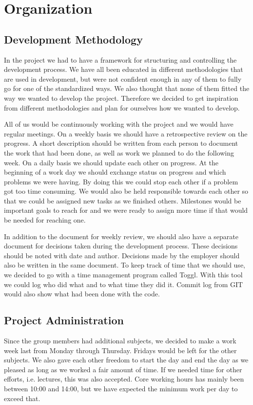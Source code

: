 \section{Organization}
\label{sec:organization}

\subsection{Development Methodology}
\label{subsec:development_methodology}
In the project we had to have a framework for structuring and controlling the
development process. We have all been educated in different methodologies that
are used in development, but were not confident enough in any of them to fully
go for one of the standardized ways. We also thought that none of them fitted 
the way we wanted to develop the project. Therefore we decided to get inspiration
from different methodologies and plan for ourselves how we wanted to develop.

All of us would be continuously working with the project and we would have
regular meetings. On a weekly basis we should have a retrospective review on
the progress. A short description should be written from each person to
document the work that had been done, as well as work we planned to do the
following week. On a daily basis we should update each other on progress. At
the beginning of a work day we should exchange status on progress and which
problems we were having. By doing this we could stop each other if a problem
got too time consuming. We would also be held responsible towards each other so
that we could be assigned new tasks as we finished others. Milestones would be
important goals to reach for and we were ready to assign more time if that
would be needed for reaching one.

In addition to the document for weekly review, we should also have a separate
document for decisions taken during the development process. These decisions
should be noted with date and author. Decisions made by the employer should
also be written in the same document. To keep track of time that we should use,
we decided to go with a time management program called Toggl. With this tool we
could log who did what and to what time they did it. Commit log from GIT would
also show what had been done with the code.


\subsection{Project Administration}
\label{subsec:project_administration}
Since the group members had additional subjects, we decided to make a work week
last from Monday through Thursday. Fridays would be left for the other
subjects. We also gave each other freedom to start the day and end the day as
we pleased as long as we worked a fair amount of time. If we needed time for
other efforts, i.e. lectures, this was also accepted. Core working hours has
mainly been between 10:00 and 14:00, but we have expected the minimum work per
day to exceed that.

